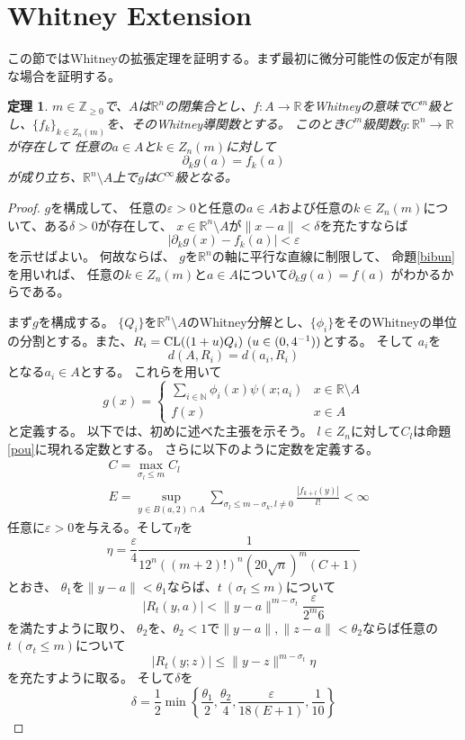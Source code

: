 \documentclass[leqno]{jsarticle}
\newtheorem{thm}{定理}
\newcommand{\nn}{\mathbb{N}}
\newcommand{\zz}{\mathbb{Z}}
\newcommand{\rr}{\mathbb{R}}
\newcommand{\ep}{\varepsilon}
\newcommand{\cl}{\text{{\rm CL}}}
\begin{document}
\section{Whitney Extension}
この節ではWhitneyの拡張定理を証明する。まず最初に微分可能性の仮定が有限な場合を証明する。
\begin{thm}\label{yuugen}
$m\in \zz_{\ge 0}$で、$A$は$\rr^n$の閉集合とし、$f:A\to \rr$をWhitneyの意味で$C^m$級とし、$\{f_k\}_{k\in Z_n(m)}$を、そのWhitney導関数とする。
このとき$C^m$級関数$g:\rr^n\to \rr$が存在して
任意の$a\in A$と$k\in Z_n(m)$に対して
\[
\partial_kg(a)=f_k(a)
\]
が成り立ち、$\rr^n\setminus A$上で$g$は$C^{\infty}$級となる。
\end{thm}
\begin{proof}
$g$を構成して、
任意の$\ep>0$と任意の$a\in A$および任意の$k\in Z_n(m)$について、ある$\delta>0$が存在して、
$x\in \rr^n\setminus A$が$\|x-a\|<\delta$を充たすならば
\[
|\partial_kg(x)-f_k(a)|<\ep
\]
を示せばよい。
何故ならば、
$g$を$\rr^n$の軸に平行な直線に制限して、
命題\ref{bibun}を用いれば、
任意の$k\in Z_n(m)$と$a\in A$について$\partial_kg(a)=f(a)$
がわかるからである。
\par
まず$g$を構成する。
$\{Q_i\}$を$\rr^n\setminus A$のWhitney分解とし、$\{\phi_i\}$をそのWhitneyの単位の分割とする。また、$R_i=\cl((1+u)Q_i)\ (u\in (0,4^{-1}))$とする。
そして
$a_i$を
\[
d(A, R_i)=d(a_i, R_i)
\]
となる$a_i\in A$とする。
これらを用いて
\[
g(x)=
\begin{cases}
\sum_{i\in \nn}\phi_i(x)\psi(x;a_i) & \text{$x\in \rr\setminus A$}\\
f(x) & \text{$x\in A$}
\end{cases}
\]
と定義する。
以下では、初めに述べた主張を示そう。
$l\in Z_n$に対して$C_l$は命題\ref{pou}に現れる定数とする。
さらに以下のように定数を定義する。
\begin{align*}
&C=\max_{\sigma_l\le m}C_l\\
&E= \sup_{y\in B(a,2)\cap A}\sum_{\sigma_l\le m-\sigma_k, l\neq 0}\frac{|f_{k+l}(y)|}{l!}<\infty
\end{align*}
任意に$\ep>0$を与える。そして$\eta$を
\[
\eta=\frac{\ep}{4}\frac{1}{12^n((m+2)!)^n(20\sqrt{n})^m(C+1)}
\]
とおき、
$\theta_1$を$\|y-a\|<\theta_1$ならば、$t\ (\sigma_t\le m)$について
\[
|R_t(y,a)|<\|y-a\|^{m-\sigma_t}\frac{\ep}{2^m6}
\]
を満たすように取り、
$\theta_2$を、$\theta_2<1$で$\|y-a\|, \|z-a\|<\theta_2$ならば任意の$t\ (\sigma_t\le m)$について
\[
|R_t(y;z)|\le \|y-z\|^{m-\sigma_t}\eta
\]
を充たすように取る。
そして$\delta$を
\[
\delta=\frac{1}{2}\min\left\{\frac{\theta_1}{2}, \frac{\theta_2}{4}, \frac{\ep}{18(E+1)}, \frac{1}{10}\right\}
\]


\end{proof}
\end{document}
